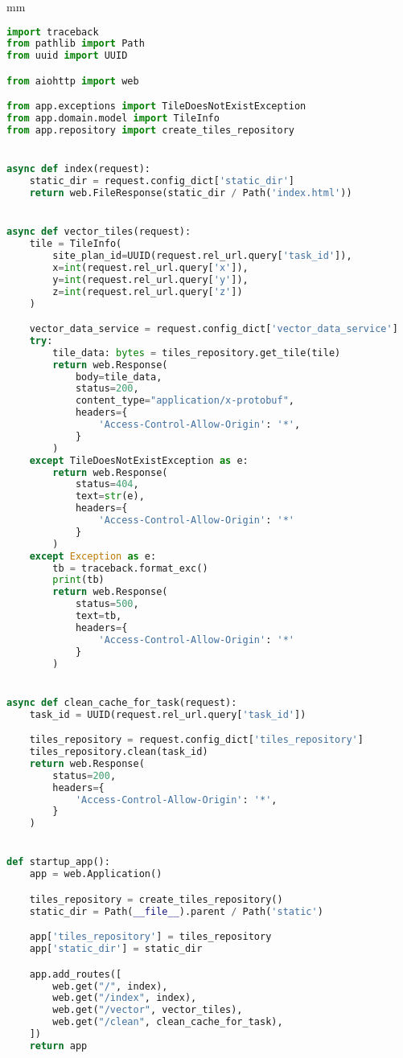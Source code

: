  mm

\begin{lstlisting}[language=Python, caption=domain/model.py, captionpos=b]
import traceback
from pathlib import Path
from uuid import UUID

from aiohttp import web

from app.exceptions import TileDoesNotExistException
from app.domain.model import TileInfo
from app.repository import create_tiles_repository


async def index(request):
    static_dir = request.config_dict['static_dir']
    return web.FileResponse(static_dir / Path('index.html'))


async def vector_tiles(request):
    tile = TileInfo(
        site_plan_id=UUID(request.rel_url.query['task_id']),
        x=int(request.rel_url.query['x']),
        y=int(request.rel_url.query['y']),
        z=int(request.rel_url.query['z'])
    )

    vector_data_service = request.config_dict['vector_data_service']
    try:
        tile_data: bytes = tiles_repository.get_tile(tile)
        return web.Response(
            body=tile_data,
            status=200,
            content_type="application/x-protobuf",
            headers={
                'Access-Control-Allow-Origin': '*',
            }
        )
    except TileDoesNotExistException as e:
        return web.Response(
            status=404,
            text=str(e),
            headers={
                'Access-Control-Allow-Origin': '*'
            }
        )
    except Exception as e:
        tb = traceback.format_exc()
        print(tb)
        return web.Response(
            status=500,
            text=tb,
            headers={
                'Access-Control-Allow-Origin': '*'
            }
        )


async def clean_cache_for_task(request):
    task_id = UUID(request.rel_url.query['task_id'])

    tiles_repository = request.config_dict['tiles_repository']
    tiles_repository.clean(task_id)
    return web.Response(
        status=200,
        headers={
            'Access-Control-Allow-Origin': '*',
        }
    )


def startup_app():
    app = web.Application()

    tiles_repository = create_tiles_repository()
    static_dir = Path(__file__).parent / Path('static')

    app['tiles_repository'] = tiles_repository
    app['static_dir'] = static_dir

    app.add_routes([
        web.get("/", index),
        web.get("/index", index),
        web.get("/vector", vector_tiles),
        web.get("/clean", clean_cache_for_task),
    ])
    return app
\end{lstlisting}